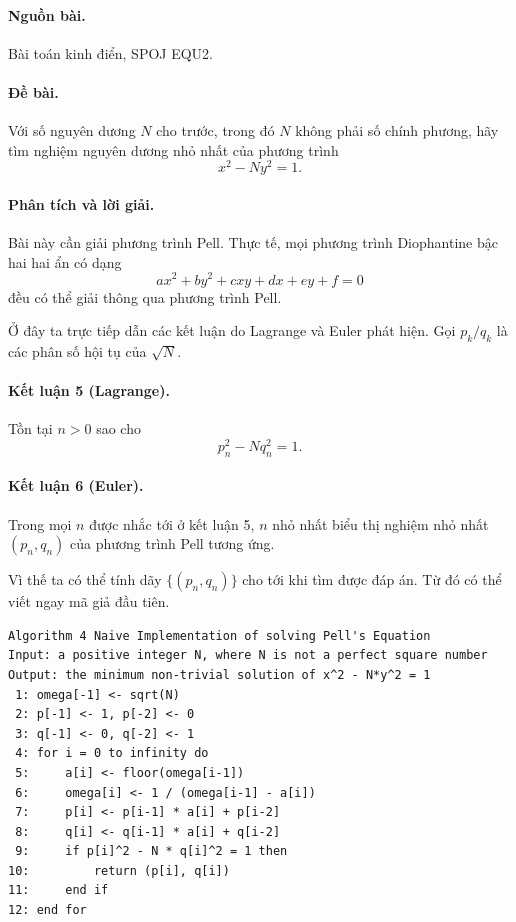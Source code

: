 \documentclass[11pt]{article}
\begin{document}
\paragraph{Nguồn bài.} Bài toán kinh điển, SPOJ EQU2.

\paragraph{Đề bài.} Với số nguyên dương $N$ cho trước, trong đó $N$ không phải
số chính phương, hãy tìm nghiệm nguyên dương nhỏ nhất của phương trình
\[
  x^2-Ny^2=1.
\]

\paragraph{Phân tích và lời giải.}
Bài này cần giải phương trình Pell. Thực tế, mọi phương trình Diophantine bậc
hai hai ẩn có dạng
\[
  ax^2+by^2+cxy+dx+ey+f=0
\]
đều có thể giải thông qua phương trình Pell.

Ở đây ta trực tiếp dẫn các kết luận do Lagrange và Euler phát hiện. Gọi
$p_k/q_k$ là các phân số hội tụ của $\sqrt N$.

\paragraph{Kết luận 5 (Lagrange).}
Tồn tại $n>0$ sao cho
\[
  p_n^2-Nq_n^2=1.
\]

\paragraph{Kết luận 6 (Euler).}
Trong mọi $n$ được nhắc tới ở kết luận 5, $n$ nhỏ nhất biểu thị nghiệm nhỏ nhất
$(p_n,q_n)$ của phương trình Pell tương ứng.

Vì thế ta có thể tính dãy $\{(p_n,q_n)\}$ cho tới khi tìm được đáp án. Từ đó
có thể viết ngay mã giả đầu tiên.

\begin{verbatim}
Algorithm 4 Naive Implementation of solving Pell's Equation
Input: a positive integer N, where N is not a perfect square number
Output: the minimum non-trivial solution of x^2 - N*y^2 = 1
 1: omega[-1] <- sqrt(N)
 2: p[-1] <- 1, p[-2] <- 0
 3: q[-1] <- 0, q[-2] <- 1
 4: for i = 0 to infinity do
 5:     a[i] <- floor(omega[i-1])
 6:     omega[i] <- 1 / (omega[i-1] - a[i])
 7:     p[i] <- p[i-1] * a[i] + p[i-2]
 8:     q[i] <- q[i-1] * a[i] + q[i-2]
 9:     if p[i]^2 - N * q[i]^2 = 1 then
10:         return (p[i], q[i])
11:     end if
12: end for
\end{verbatim}
\end{document}
